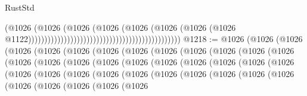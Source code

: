 \begin{lexlean}{RustStd}
\begin{coremodule}
{\begin{coremodule}
{{{{{{{{{{{{{{{{{{{{{{{{{{{{{{{{{{{{{                                                                                  (@1026
                                                                                    (@1026
                                                                                      (@1026
                                                                                        (@1026
                                                                                          (@1026
                                                                                            (@1026
                                                                                              (@1026
                                                                                                (@1026
                                                                                                  @1122)))))))))))))))))))))))))))))))))))))))))))))))
@1218 := @1026
    (@1026
      (@1026
        (@1026
          (@1026
            (@1026
              (@1026
                (@1026
                  (@1026
                    (@1026
                      (@1026
                        (@1026
                          (@1026
                            (@1026
                              (@1026
                                (@1026
                                  (@1026
                                    (@1026
                                      (@1026
                                        (@1026
                                          (@1026
                                            (@1026
                                              (@1026
                                                (@1026
                                                  (@1026
                                                    (@1026
                                                      (@1026
                                                        (@1026
                                                          (@1026
                                                            (@1026
                                                              (@1026
                                                                (@1026
                                                                  (@1026
                                                                    (@1026
                                                                      (@1026
                                                                        (@1026
                                                                          (@1026
                                                                            (@1026
}}}}}}}}}}}}}}}}}}}}}}}}}}}}}}}}}}}}}
\end{coremodule}}
\end{coremodule}
\end{lexlean}
